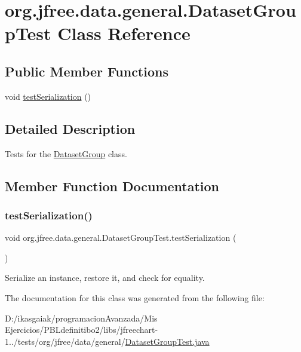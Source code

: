 \hypertarget{classorg_1_1jfree_1_1data_1_1general_1_1_dataset_group_test}{}\section{org.\+jfree.\+data.\+general.\+Dataset\+Group\+Test Class Reference}
\label{classorg_1_1jfree_1_1data_1_1general_1_1_dataset_group_test}
\subsection*{Public Member Functions}
\begin{DoxyCompactItemize}
\item 
void \mbox{\hyperlink{classorg_1_1jfree_1_1data_1_1general_1_1_dataset_group_test_a05fb3337a3fed8824c73ee64b70dad4e}{test\+Serialization}} ()
\end{DoxyCompactItemize}


\subsection{Detailed Description}
Tests for the \mbox{\hyperlink{classorg_1_1jfree_1_1data_1_1general_1_1_dataset_group}{Dataset\+Group}} class. 

\subsection{Member Function Documentation}
\mbox{\label{classorg_1_1jfree_1_1data_1_1general_1_1_dataset_group_test_a05fb3337a3fed8824c73ee64b70dad4e}} 
\subsubsection{\texorpdfstring{test\+Serialization()}{testSerialization()}}
{\footnotesize\ttfamily void org.\+jfree.\+data.\+general.\+Dataset\+Group\+Test.\+test\+Serialization (\begin{DoxyParamCaption}{ }\end{DoxyParamCaption})}

Serialize an instance, restore it, and check for equality. 

The documentation for this class was generated from the following file\+:\begin{DoxyCompactItemize}
\item 
D\+:/ikasgaiak/programacion\+Avanzada/\+Mis Ejercicios/\+P\+B\+Ldefinitibo2/libs/jfreechart-\/1../tests/org/jfree/data/general/\mbox{\hyperlink{_dataset_group_test_8java}{Dataset\+Group\+Test.\+java}}\end{DoxyCompactItemize}
